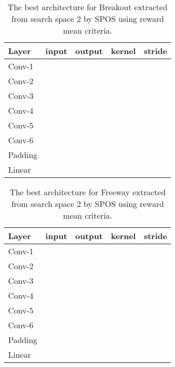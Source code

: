 \documentclass{svproc}
\begin{document}
\begin{appendix}
\begin{table}[!h]
\begin{center}
\begin{tabularx}{0.5\textwidth}{@{}lcccc@{}}
    \hline
    \textbf{Layer} & \textbf{input} & \textbf{output} & \textbf{kernel} & \textbf{stride}\\
    \hline
        Conv-1 &  &  &  &          \\
        Conv-2 &  &  &  &         \\
        Conv-3 &  &  &  &         \\
        Conv-4 &  &  &  &         \\
        Conv-5 &  &  &  &         \\
        Conv-6 &  &  &  &         \\
        Padding &  &  &  &     \\        
        Linear &  &  &  &    \\
    \hline
\end{tabularx}
\caption{The best architecture for Breakout extracted from search space 2 by SPOS using reward mean criteria.}\label{tab:best-3}
\end{center}
\end{table}

\begin{table}[!h]
\begin{center}
\begin{tabularx}{0.5\textwidth}{@{}lcccc@{}}
    \hline
    \textbf{Layer} & \textbf{input} & \textbf{output} & \textbf{kernel} & \textbf{stride}\\
    \hline
        Conv-1 &  &  &  &          \\
        Conv-2 &  &  &  &         \\
        Conv-3 &  &  &  &         \\
        Conv-4 &  &  &  &         \\
        Conv-5 &  &  &  &         \\
        Conv-6 &  &  &  &         \\
        Padding &  &  &  &     \\        
        Linear &  &  &  &    \\
    \hline
\end{tabularx}
\caption{The best architecture for Freeway extracted from search space 2 by SPOS using reward mean criteria.\\
}\label{tab:best-4}
\end{center}
\end{table}


\end{appendix}
\end{document}

